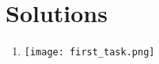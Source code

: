 \documentclass{article}
\begin{document}

\section*{Solutions}
\begin{enumerate}
    \item 
        \centering
        \texttt{[image: first\_task.png]} %
    
\end{enumerate}
\end{document}
